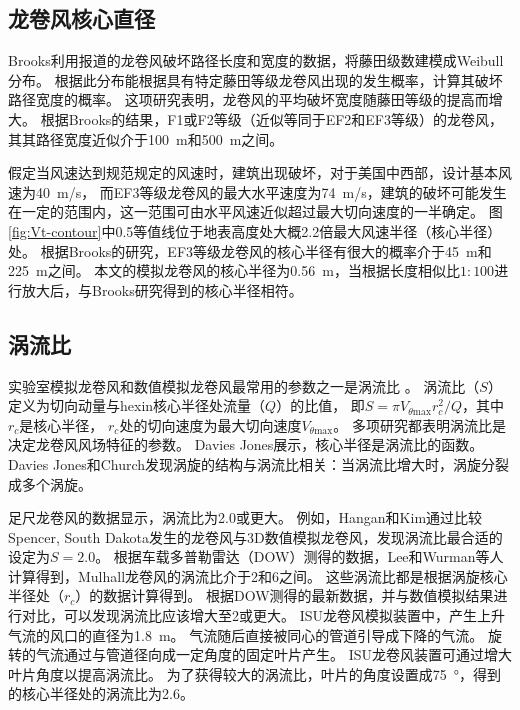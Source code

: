 \documentclass{ctexart}
\begin{document}
\subsection{龙卷风核心直径}
Brooks\cite{brooks2004relationship}利用报道的龙卷风破坏路径长度和宽度的数据，将藤田级数建模成Weibull分布。
根据此分布能根据具有特定藤田等级龙卷风出现的发生概率，计算其破坏路径宽度的概率。
这项研究表明，龙卷风的平均破坏宽度随藤田等级的提高而增大。
根据Brooks的结果\cite{brooks2004relationship}，F1或F2等级（近似等同于EF2和EF3等级）的龙卷风，其其路径宽度近似介于\SI{100}{m}和\SI{500}{m}之间。

假定当风速达到规范规定的风速时，建筑出现破坏，对于美国中西部，设计基本风速为\SI{40}{m/s}，
而EF3等级龙卷风的最大水平速度为\SI{74}{m/s}，建筑的破坏可能发生在一定的范围内，这一范围可由水平风速近似超过最大切向速度的一半确定。
图\ref{fig:Vt-contour}中0.5等值线位于地表高度处大概2.2倍最大风速半径（核心半径）处。
根据Brooks的研究，EF3等级龙卷风的核心半径有很大的概率介于\SI{45}{m}和\SI{225}{m}之间。
本文的模拟龙卷风的核心半径为\SI{0.56}{m}，当根据长度相似比$1:100$进行放大后，与Brooks研究得到的核心半径相符。

\subsection{涡流比}
实验室模拟龙卷风和数值模拟龙卷风最常用的参数之一是涡流比\cite{haan2008design} \cite{hangan2008swirl}。
涡流比（$S$）定义为切向动量与hexin核心半径处流量（$Q$）的比值，
即$S=\pi V_{\theta \mathrm{max}}r_c^2/Q$，其中$r_c$是核心半径，
$r_c$处的切向速度为最大切向速度$V_{\theta \mathrm{max}}$。
多项研究都表明涡流比是决定龙卷风风场特征的参数\cite{hangan2008swirl}\cite{church1979characteristics}\cite{davies1973dependence}。
Davies Jones展示，核心半径是涡流比的函数。
Davies Jones和Church发现涡旋的结构与涡流比相关：当涡流比增大时，涡旋分裂成多个涡旋\cite{davies1973dependence}。

足尺龙卷风的数据显示，涡流比为\num{2.0}或更大。
例如，Hangan和Kim通过比较Spencer, South Dakota发生的龙卷风与3D数值模拟龙卷风\cite{hangan2008swirl}，发现涡流比最合适的设定为$S=2.0$。
根据车载多普勒雷达（DOW）测得的数据，Lee和Wurman等人\cite{lee2005diagnosed}计算得到，Mulhall龙卷风的涡流比介于\num{2}和\num{6}之间。
这些涡流比都是根据涡旋核心半径处（$r_c$）的数据计算得到。
根据DOW测得的最新数据，并与数值模拟结果进行对比，可以发现涡流比应该增大至\num{2}或更大。
ISU龙卷风模拟装置中，产生上升气流的风口的直径为\SI{1.8}{\meter}。
气流随后直接被同心的管道引导成下降的气流。
旋转的气流通过与管道径向成一定角度的固定叶片产生。
ISU龙卷风装置可通过增大叶片角度\cite{haan2008design}以提高涡流比。
为了获得较大的涡流比，叶片的角度设置成\SI{75}{\degree}，得到的核心半径处的涡流比为\num{2.6}。
\end{document}
